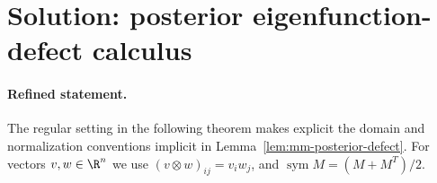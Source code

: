 \documentclass[../main.tex]{subfiles}
\begin{document}
%
\section*{Solution: posterior eigenfunction-defect calculus}
\label{sec:sol-lem-mm-posterior-defect}

\paragraph{Refined statement.}
The regular setting in the following theorem makes explicit the domain and normalization
conventions implicit in Lemma~\ref{lem:mm-posterior-defect}.  For vectors $v,w\in\R^n$ we use
$(v\otimes w)_{ij}=v_iw_j$, and
$\operatorname{sym}M=(M+M^T)/2$.
\end{document}
